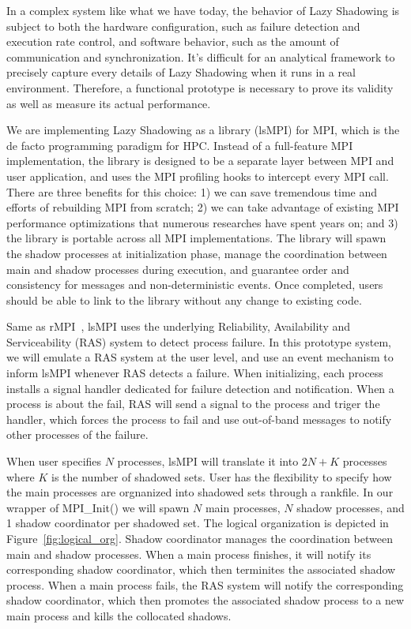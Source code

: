 In a complex system like what we have today, the behavior of Lazy Shadowing is subject to both the hardware configuration, such as failure detection and execution rate control, and software behavior, such as the amount of communication and synchronization. 
It's difficult for an analytical framework to precisely capture every details of Lazy Shadowing when it runs in a real environment. Therefore, a functional prototype is necessary to prove its validity as well as measure its actual performance. 

We are implementing Lazy Shadowing as a library (lsMPI) for MPI, which is the de facto programming paradigm for HPC. Instead of a full-feature MPI implementation, the library is designed to be a separate layer between MPI and user application, and uses the MPI profiling hooks to intercept every MPI call. There are three benefits for this choice: 1) we can save tremendous time and efforts of rebuilding MPI from scratch; 2) we can take advantage of existing MPI performance optimizations that numerous researches have spent years on; and 3) the library is portable across all MPI implementations. 
The library will spawn the shadow processes at initialization phase, manage the coordination between main and shadow processes during execution, and guarantee order and consistency for messages and non-deterministic events.
Once completed, users should be able to link to the library without any change to existing code. 

Same as rMPI~\cite{ferreira_sc_2011}, lsMPI uses the underlying Reliability, Availability and Serviceability (RAS) system to detect process failure. In this prototype system, we will emulate a RAS system at the user level, and use an event mechanism to inform lsMPI whenever RAS detects a failure. When initializing, each process installs a signal handler dedicated for failure detection and notification. When a process is about the fail, RAS will send a signal to the process and triger the handler, which forces the process to fail and use out-of-band messages to notify other processes of the failure. 

When user specifies $N$ processes, lsMPI will translate it into $2N + K$ processes where $K$ is the number of shadowed sets. User has the flexibility to specify how the main processes are orgnanized into shadowed sets through a rankfile. In our wrapper of MPI\_Init() we will spawn $N$ main processes, $N$ shadow processes, and 1 shadow coordinator per shadowed set. The logical organization is depicted in Figure~\ref{fig:logical_org}. Shadow coordinator manages the coordination between main and shadow processes. When a main process finishes, it will notify its corresponding shadow coordinator, which then terminites the associated shadow process. When a main process fails, the RAS system will notify the corresponding shadow coordinator, which then promotes the associated shadow process to a new main process and kills the collocated shadows.


